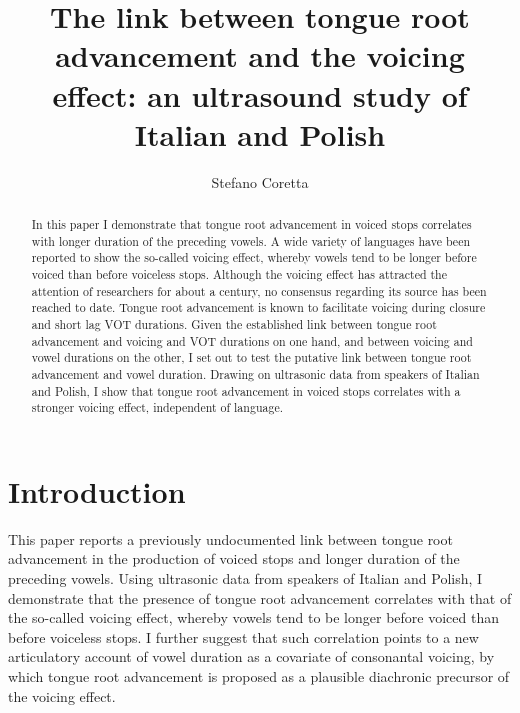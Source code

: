 \documentclass[authoryear, 5p]{elsarticle}
\date{}
\begin{document}
\begin{frontmatter}

\title{The link between tongue root advancement and the voicing effect: an ultrasound study of Italian and Polish}

\author[mcr]{Stefano Coretta}
\address[mcr]{University of Manchester, Linguistics and English Language}

\begin{abstract}
In this paper I demonstrate that tongue root advancement in voiced stops correlates with longer duration of the preceding vowels. A wide variety of languages have been reported to show the so-called voicing effect, whereby vowels tend to be longer before voiced than before voiceless stops. Although the voicing effect has attracted the attention of researchers for about a century, no consensus regarding its source has been reached to date.
Tongue root advancement is known to facilitate voicing during closure and short lag VOT durations.
Given the established link between tongue root advancement and voicing and VOT durations on one hand, and between voicing and vowel durations on the other, I set out to test the putative link between tongue root advancement and vowel duration.
Drawing on ultrasonic data from speakers of Italian and Polish, I show that tongue root advancement in voiced stops correlates with a stronger voicing effect, independent of language.
\end{abstract}

\end{frontmatter}

\section{Introduction}\label{introduction}

\label{s:intro}

This paper reports a previously undocumented link between tongue root
advancement in the production of voiced stops and longer duration of the
preceding vowels. Using ultrasonic data from speakers of Italian and
Polish, I demonstrate that the presence of tongue root advancement
correlates with that of the so-called voicing effect, whereby vowels
tend to be longer before voiced than before voiceless stops. I further
suggest that such correlation points to a new articulatory account of
vowel duration as a covariate of consonantal voicing, by which tongue
root advancement is proposed as a plausible diachronic precursor of the
voicing effect.
\end{document}
